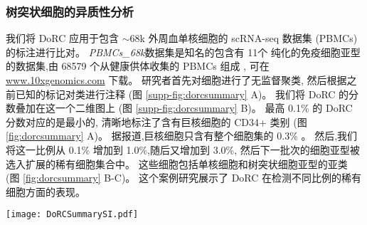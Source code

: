 

\subsubsection{树突状细胞的异质性分析}

我们将 DoRC 应用于包含 ${\sim}68$k 外周血单核细胞的 scRNA-seq 数据集 (PBMCs) 的标注进行比对。
 \textit{PBMCs\_68k}数据集是知名的包含有 11个 纯化的免疫细胞亚型的数据集,由 68579 个从健康供体收集的 PBMCs 组成 \cite{zheng2017massively},
可在 \url{www.10xgenomics.com} 下载。
研究者首先对细胞进行了无监督聚类,
然后根据之前已知的标记对类进行注释 (图 \ref{supp-fig:dorcsummary} A)。
我们将 DoRC 的分数叠加在这一个二维图上 (图 \ref{supp-fig:dorcsummary} B)。
最高 0.1\% 的 DoRC 分数对应的是最小的, 
清晰地标注了含有巨核细胞的 CD34+ 类别 (图 \ref{fig:dorcsummary} A)。
据报道,巨核细胞只含有整个细胞集的 0.3\% \cite{zheng2017massively}。
然后,我们将这一比例从 0.1\% 增加到 1.0\%,随后又增加到 3.0\%,
然后下一批次的细胞亚型被选入扩展的稀有细胞集合中。
这些细胞包括单核细胞和树突状细胞亚型的亚类 (图 \ref{fig:dorcsummary} B-C)。
这个案例研究展示了 DoRC 在检测不同比例的稀有细胞方面的表现。

\begin{figure*}[!htbp]
    \centering
    \texttt{[image: DoRCSummarySI.pdf]}
    \caption{
    DoRC 在 PBMCs\_68k 上的性能评估。
    (A) 基于 t-SNE 的二维嵌入数据集可视化图,按 Zheng 等所报道的鉴定的不同类别用不同的颜色标记。
    (B) PBMCs\_68k 上细胞的 DoRC 得分热图。巨核细胞群 (0.3\%),是所有细胞类型中最稀有的细胞,获得了最高的 DoRC 分数。
    (C) 使用 IQR 阈值标准后 DoRC 识别的稀有细胞。
    }
    \label{supp-fig:dorcsummary}
\end{figure*}

